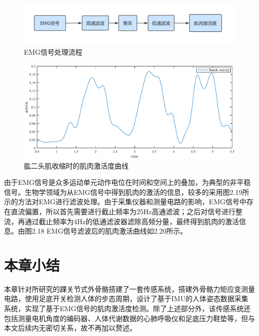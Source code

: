 \begin{figure}[htb]
    \includegraphics[width=16cm]{fig/f47.png}
    \caption{EMG信号处理流程}
    \label{fig:mark}
\end{figure}

\begin{figure}[!h]
    \includegraphics[width=17cm]{fig/f46.eps}
    \caption{肱二头肌收缩时的肌肉激活度曲线}
    \label{fig:mark}
\end{figure}

由于EMG信号是众多运动单元动作电位在时间和空间上的叠加，为典型的非平稳信号。生物学领域为从EMG信号中得到肌肉的激活的信息，较多的采用图2.19所示的方法对EMG进行滤波处理\cite{p45}。由于采集仪器和测量电路的影响，EMG信号中存在直流偏置，所以首先需要进行截止频率为25Hz高通滤波；之后对信号进行整流，再通过截止频率为4Hz的低通滤波器滤除高频分量，最终得到肌肉的激活信息。由图2.18 EMG信号滤波后的肌肉激活曲线如2.20所示。

\section{本章小结}

本章针对所研究的踝关节式外骨骼搭建了一套传感系统，搭建外骨骼力矩应变测量电路，使用足底开关检测人体的步态周期，设计了基于IMU的人体姿态数据采集系统，实现了基于EMG信号的肌肉激活度检测。除了上述部分外，该传感系统还包括测量电机角度的编码器、人体代谢数据的心肺呼吸仪和足底压力鞋垫等，但与本文后续内无密切关系，故不再加以赘述。